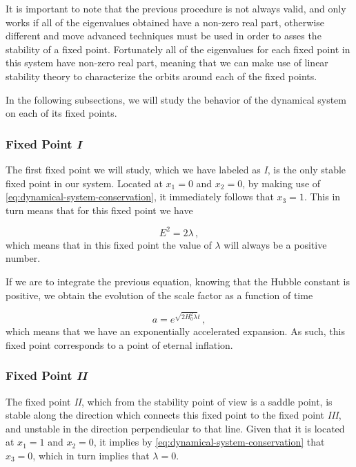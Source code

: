 It is important to note that the previous procedure is not always valid, and only works if all of the eigenvalues obtained have a non-zero real part, otherwise different and move advanced techniques must be used in order to asses the stability of a fixed point. Fortunately all of the eigenvalues for each fixed point in this system have non-zero real part, meaning that we can make use of linear stability theory to characterize the orbits around each of the fixed points.

In the following subsections, we will study the behavior of the dynamical system on each of its fixed points.

\subsubsection{Fixed Point \textit{I}}
The first fixed point we will study, which we have labeled as \textit{I}, is the only stable fixed point in our system. Located at $x_1 = 0$ and $x_2 = 0$, by making use of \cref{eq:dynamical-system-conservation}, it immediately follows that $x_3 = 1$. This in turn means that for this fixed point we have

\begin{equation}
    E^2 = 2 \lambda \,,
\end{equation}
which means that in this fixed point the value of $\lambda$ will always be a positive number.

\noindent If we are to integrate the previous equation, knowing that the Hubble constant is positive, we obtain the evolution of the scale factor as a function of time

\begin{equation}
    a = e^{\sqrt{2 H_0^2 \lambda} t} \,,
\end{equation}
which means that we have an exponentially accelerated expansion. As such, this fixed point corresponds to a point of eternal inflation.

\subsubsection{Fixed Point \textit{II}}
The fixed point \textit{II}, which from the stability point of view is a saddle point, is stable along the direction which connects this fixed point to the fixed point \textit{III}, and unstable in the direction perpendicular to that line. Given that it is located at $x_1 = 1$ and $x_2 = 0$, it implies by \cref{eq:dynamical-system-conservation} that $x_3 = 0$, which in turn implies that $\lambda = 0$.

